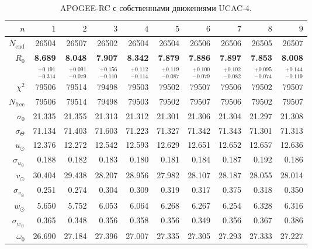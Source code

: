 \documentclass{matmex-diploma-custom}
\begin{document}
\begin{table}[h!!]
\centering
\caption{APOGEE-RC с собственными движениями UCAC-4.}
\begin{tabular}{r|rrr|rrr|rrr}
\hline
$n$ & $1$ & $2$ & $3$ & $4$ & $5$&$ 6 $&$ 7 $&$ 8 $&$ 9 $\\\hline
 $N_{\mathrm{end}}$ & 26504       &   26507 &   26502 &   26504 &   26504 &   26506 &   26506 &   26505 &   26507 \\
 $R_0 $& \textbf{8.689}       &   \textbf{8.048} &   \textbf{7.907} &   \textbf{8.342} &   \textbf{7.879} &   \textbf{7.886} &   \textbf{7.897} &   \textbf{7.853} &   \textbf{8.008} \\
       & $_{-0.314}^{+0.191} $ & $_{-0.079}^{+0.091}$ & $_{-0.110}^{+0.156}$   & $_{-0.114}^{+0.112}$  & $_{-0.087}^{+0.119}$  & $_{-0.079}^{+0.100}$  & $_{-0.082}^{+0.102}$  & $_{-0.074}^{+0.095}$  & $_{-0.119}^{+0.144}$  \\\hline
 $\chi^2 $& 79506   &   79514 &   79498 &   79503 &   79502 &   79507 &   79506 &   79502 &   79507 \\
 $N_{\mathrm{free}} $& 79506      &  79514 &   79498 &   79503 &   79502 &   79507 &   79506 &   79502 &   79507 \\
 $\sigma_0 $& 21.335      &  21.355 &  21.313 &  21.312 &  21.301 &  21.306 &  21.304 &  21.297 &  21.308  \\ 
 $\sigma_{\Theta} $& 71.134      &  71.403 &  71.603 &  71.223 &  71.327 &  71.342 &  71.343 &  71.301 &  71.313  \\\hline 
 $ u_{\odot} $& 12.376      &  12.272 &  12.542 &  12.593 &  12.629 &  12.651 &  12.652 &  12.657 &  12.636 \\
 $\sigma_{u_{\odot}} $&0.188       &   0.182 &   0.183 &    0.180 &   0.181 &   0.184 &   0.187 &   0.192 &   0.186 \\
 $v_{\odot} $& 30.404      &  29.438 &  28.207 &  28.956 &  27.982 &  28.107 &  28.187 &  28.055 &  28.014 \\
 $\sigma_{v_{\odot}}$&0.251       &   0.274 &   0.304 &   0.309 &   0.319 &   0.317 &   0.375 &   0.318 &    0.350 \\
 $w_{\odot} $& 5.650       &   5.752 &   6.053 &   6.064 &   6.268 &   6.267 &   6.254 &   6.328 &   6.316 \\
 $\sigma_{w_{\odot}}$&0.365       &   0.348 &   0.356 &   0.358 &   0.356 &   0.349 &   0.356 &   0.367 &   0.386 \\
 $\omega_0 $&26.690      &  27.184 &  27.396 &  27.007 &  27.335 &  27.305 &  27.293 &  27.333 &  27.227 \\

\end{tabular}
\end{table}
\end{document}
